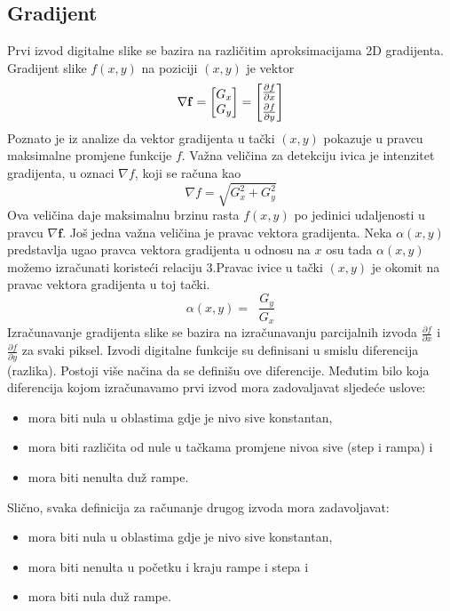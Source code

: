 ﻿\documentclass[conference]{IEEEtran}
\DeclareMathOperator{\taninv}{tan^{-1}}
\begin{document}
\subsection{Gradijent}
Prvi izvod digitalne slike se bazira na različitim aproksimacijama 2D gradijenta. Gradijent slike $f(x,y)$ na poziciji $(x,y)$ je vektor
\begin{equation}
    \nabla \mathbf{f} = \begin{bmatrix}
           G_{x} \\
           G_{y} 
         \end{bmatrix} = \begin{bmatrix}
          \frac{\partial f}{\partial x} \vspace{0.1cm}\\
           \frac{\partial f}{\partial y} 
         \end{bmatrix}
\end{equation}
Poznato je iz analize da vektor gradijenta u tački $(x,y)$ pokazuje u pravcu maksimalne promjene funkcije $f$. Važna veličina za detekciju ivica je intenzitet gradijenta, u oznaci $\nabla f$, koji se računa kao 
\begin{equation}
    \nabla f = \sqrt{G_x^2 + G_y^2}
\end{equation}
Ova veličina daje maksimalnu brzinu rasta $f(x,y)$ po jedinici udaljenosti u pravcu $\nabla \mathbf{f}$.  
Još jedna važna veličina je pravac vektora gradijenta. Neka  $\alpha(x,y)$ predstavlja ugao pravca vektora gradijenta u odnosu na $x$ osu tada $\alpha(x,y)$ možemo izračunati koristeći relaciju 3.Pravac ivice u tački $(x,y)$ je okomit na pravac vektora gradijenta u toj tački. 
\begin{equation}
    \alpha(x,y)=\taninv\frac{G_y}{G_x}
\end{equation}
Izračunavanje gradijenta slike se bazira na izračunavanju parcijalnih izvoda $\frac{\partial f}{\partial x}$ i $\frac{\partial f}{\partial y}$ za svaki piksel. Izvodi digitalne funkcije su definisani u smislu diferencija (razlika). Postoji više načina da se definišu ove diferencije. Međutim bilo koja diferencija kojom izračunavamo prvi izvod mora zadovaljavat sljedeće uslove:
\begin{itemize}
    \item mora biti nula u oblastima gdje je nivo sive konstantan,
    \item mora biti različita od nule u tačkama promjene nivoa sive (step i rampa) i
    \item mora biti nenulta duž rampe.
\end{itemize}
Slično, svaka definicija za računanje drugog izvoda mora zadavoljavat:
\begin{itemize}
    \item  mora biti nula u oblastima gdje je nivo sive konstantan,
    \item  mora biti nenulta u početku i kraju rampe i stepa i 
    \item  mora biti nula duž rampe.
\end{itemize}
 
\end{document}
